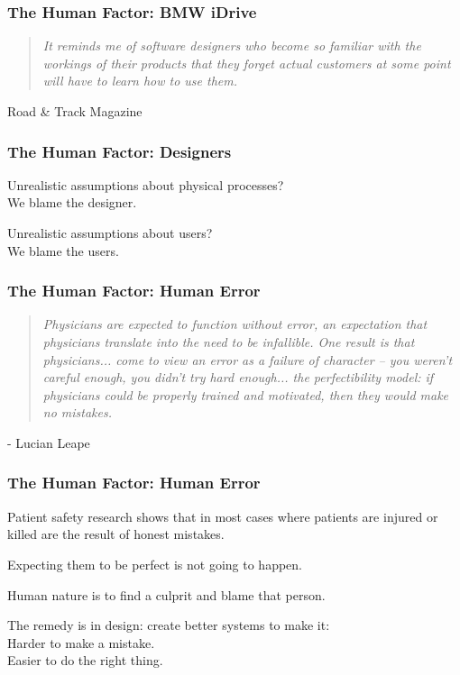 \begin{frame}
\frametitle{The Human Factor: BMW iDrive}
\begin{changemargin}{1cm}
\begin{quote}
\textit{It reminds me of software designers who become so familiar with the workings of their products that they forget actual customers at some point will have to learn how to use them.}
\end{quote}
\hfill Road \& Track Magazine
\end{changemargin}
\end{frame}

\begin{frame}
\frametitle{The Human Factor: Designers}
\begin{changemargin}{1cm}
Unrealistic assumptions about physical processes?\\
\quad We blame the designer.

Unrealistic assumptions about users? \\
\quad We blame the users.
\end{changemargin}
\end{frame}


\begin{frame}
\frametitle{The Human Factor: Human Error}
\begin{changemargin}{1cm}

\begin{quote}
\textit{Physicians are expected to function without error, an expectation that physicians translate into the need to be infallible. One result is that physicians... come to view an error as a failure of character -- you weren't careful enough, you didn't try hard enough... the perfectibility model: if physicians could be properly trained and motivated, then they would make no mistakes.}
\end{quote}
\hfill - Lucian Leape

\end{changemargin}
\end{frame}


\begin{frame}
\frametitle{The Human Factor: Human Error}
\begin{changemargin}{1cm}

Patient safety research shows that in most cases where patients are injured or killed are the result of honest mistakes.

Expecting them to be perfect is not going to happen.

Human nature is to find a culprit and blame that person.

The remedy is in design: create better systems to make it: \\
\quad Harder to make a mistake.\\
\quad Easier to do the right thing.

\end{changemargin}
\end{frame}


